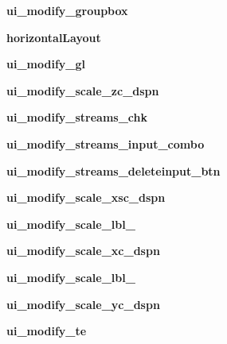 \begin{DoxyCompactItemize}
\hypertarget{a00075_aa645e27296dab9e5638379386ea917e8}{}\label{a00075_aa645e27296dab9e5638379386ea917e8} 
{\bfseries ui\+\_\+modify\+\_\+groupbox}
\item 
\hypertarget{a00075_a26736563b6a21e18aa6259ad090095f6}{}\label{a00075_a26736563b6a21e18aa6259ad090095f6} 
{\bfseries horizontal\+Layout}
\item 
\hypertarget{a00075_adbd7e377be21c4d3b65945e822f6d16a}{}\label{a00075_adbd7e377be21c4d3b65945e822f6d16a} 
{\bfseries ui\+\_\+modify\+\_\+gl}
\item 
\hypertarget{a00075_a45676686abc65792ca2563bc755bf1fc}{}\label{a00075_a45676686abc65792ca2563bc755bf1fc} 
{\bfseries ui\+\_\+modify\+\_\+scale\+\_\+zc\+\_\+dspn}
\item 
\hypertarget{a00075_a6d932026d0608e9101dc635e53e14b39}{}\label{a00075_a6d932026d0608e9101dc635e53e14b39} 
{\bfseries ui\+\_\+modify\+\_\+streams\+\_\+chk}
\item 
\hypertarget{a00075_aa5c75d1179f2057b2870faeb125ba159}{}\label{a00075_aa5c75d1179f2057b2870faeb125ba159} 
{\bfseries ui\+\_\+modify\+\_\+streams\+\_\+input\+\_\+combo}
\item 
\hypertarget{a00075_a975e1c1c7915c37fc9a24064f29b0ba6}{}\label{a00075_a975e1c1c7915c37fc9a24064f29b0ba6} 
{\bfseries ui\+\_\+modify\+\_\+streams\+\_\+deleteinput\+\_\+btn}
\item 
\hypertarget{a00075_a8a7176b6c27c85fb33c76775294b0b80}{}\label{a00075_a8a7176b6c27c85fb33c76775294b0b80} 
{\bfseries ui\+\_\+modify\+\_\+scale\+\_\+xsc\+\_\+dspn}
\item 
\hypertarget{a00075_a86a79f9b08cfaf52544470b8392b2978}{}\label{a00075_a86a79f9b08cfaf52544470b8392b2978} 
{\bfseries ui\+\_\+modify\+\_\+scale\+\_\+lbl\+\_}
\item 
\hypertarget{a00075_ae36e5bd681ee713671843137c9328bc6}{}\label{a00075_ae36e5bd681ee713671843137c9328bc6} 
{\bfseries ui\+\_\+modify\+\_\+scale\+\_\+xc\+\_\+dspn}
\item 
\hypertarget{a00075_a69a6abf1b7b08db89a7a0f640590d037}{}\label{a00075_a69a6abf1b7b08db89a7a0f640590d037} 
{\bfseries ui\+\_\+modify\+\_\+scale\+\_\+lbl\+\_}
\item 
\hypertarget{a00075_a66b3b327058352a8f531970b3e41bf6f}{}\label{a00075_a66b3b327058352a8f531970b3e41bf6f} 
{\bfseries ui\+\_\+modify\+\_\+scale\+\_\+yc\+\_\+dspn}
\item 
\hypertarget{a00075_aefc951ed87303c4d5f2a3c5801b17441}{}\label{a00075_aefc951ed87303c4d5f2a3c5801b17441} 
{\bfseries ui\+\_\+modify\+\_\+te}
\item 

\end{DoxyCompactItemize}
